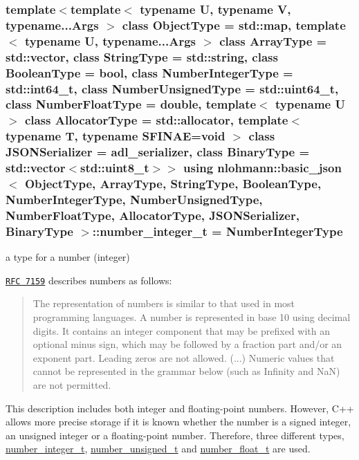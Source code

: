 \subsubsection[{\texorpdfstring{number\+\_\+integer\+\_\+t}{number_integer_t}}]{\setlength{\rightskip}{0pt plus 5cm}template$<$template$<$ typename U, typename V, typename...\+Args $>$ class Object\+Type = std\+::map, template$<$ typename U, typename...\+Args $>$ class Array\+Type = std\+::vector, class String\+Type  = std\+::string, class Boolean\+Type  = bool, class Number\+Integer\+Type  = std\+::int64\+\_\+t, class Number\+Unsigned\+Type  = std\+::uint64\+\_\+t, class Number\+Float\+Type  = double, template$<$ typename U $>$ class Allocator\+Type = std\+::allocator, template$<$ typename T, typename S\+F\+I\+N\+A\+E=void $>$ class J\+S\+O\+N\+Serializer = adl\+\_\+serializer, class Binary\+Type  = std\+::vector$<$std\+::uint8\+\_\+t$>$$>$ using {\bf nlohmann\+::basic\+\_\+json}$<$ Object\+Type, Array\+Type, String\+Type, Boolean\+Type, Number\+Integer\+Type, Number\+Unsigned\+Type, Number\+Float\+Type, Allocator\+Type, J\+S\+O\+N\+Serializer, Binary\+Type $>$\+::{\bf number\+\_\+integer\+\_\+t} =  Number\+Integer\+Type}\hypertarget{classnlohmann_1_1basic__json_a11e390944da90db83089eb2426a749d3}{}\label{classnlohmann_1_1basic__json_a11e390944da90db83089eb2426a749d3}


a type for a number (integer) 

\href{http://rfc7159.net/rfc7159}{\tt R\+FC 7159} describes numbers as follows\+: \begin{quote}
The representation of numbers is similar to that used in most programming languages. A number is represented in base 10 using decimal digits. It contains an integer component that may be prefixed with an optional minus sign, which may be followed by a fraction part and/or an exponent part. Leading zeros are not allowed. (...) Numeric values that cannot be represented in the grammar below (such as Infinity and NaN) are not permitted. \end{quote}


This description includes both integer and floating-\/point numbers. However, C++ allows more precise storage if it is known whether the number is a signed integer, an unsigned integer or a floating-\/point number. Therefore, three different types, \hyperlink{classnlohmann_1_1basic__json_a11e390944da90db83089eb2426a749d3}{number\+\_\+integer\+\_\+t}, \hyperlink{classnlohmann_1_1basic__json_ae09af9c23351b7245d9be4d1b2035fef}{number\+\_\+unsigned\+\_\+t} and \hyperlink{classnlohmann_1_1basic__json_a5b8abaebd922d82d69756327c0c347e6}{number\+\_\+float\+\_\+t} are used.


